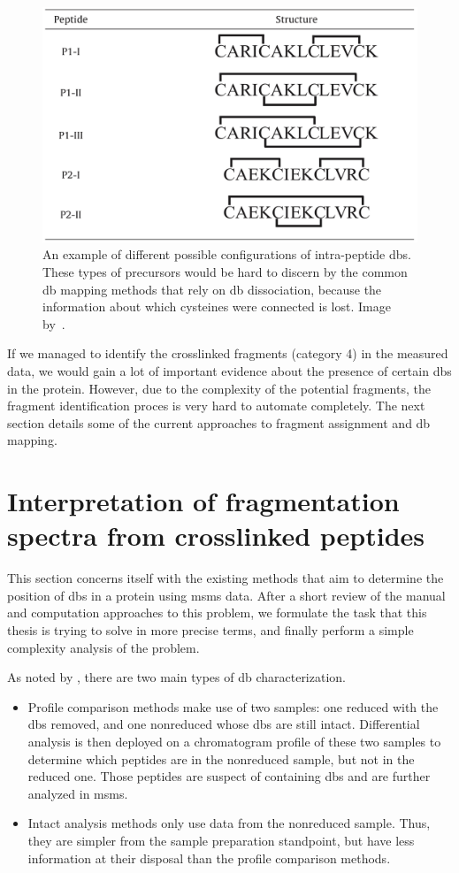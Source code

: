 \begin{figure}
  \centering
  \includegraphics[width=.5\linewidth]{img/intrapeptide-bond.jpeg}
  \caption{An example of different possible configurations of intra-peptide \glspl*{db}. These types of precursors would be hard to discern by the common \gls*{db} mapping methods that rely on \gls*{db} dissociation, because the information about which cysteines were connected is lost. Image by~\citet{durand2013tandem}.}\label{fig:intrapeptide-bonds}
\end{figure}

If we managed to identify the crosslinked fragments (category 4) in the measured data, we would gain a lot of important evidence about the presence of certain \glspl*{db} in the protein. However, due to the complexity of the potential fragments, the fragment identification proces is very hard to automate completely. The next section details some of the current approaches to fragment assignment and \gls*{db} mapping.

\section{Interpretation of fragmentation spectra from crosslinked peptides}\label{sec:analysis}

This section concerns itself with the existing methods that aim to determine the position of \glspl*{db} in a protein using \gls*{msms} data. After a short review of the manual and computation approaches to this problem, we formulate the task that this thesis is trying to solve in more precise terms, and finally perform a simple complexity analysis of the problem.

As noted by \citet{lakbub2018recent}, there are two main types of \gls*{db} characterization.

\begin{itemize}
  \item Profile comparison methods make use of two samples: one reduced with the \glspl*{db} removed, and one nonreduced whose \glspl*{db} are still intact. Differential analysis is then deployed on a chromatogram profile of these two samples to determine which peptides are in the nonreduced sample, but not in the reduced one. Those peptides are suspect of containing \glspl*{db} and are further analyzed in \gls*{msms}\@.
  \item Intact analysis methods only use data from the nonreduced sample. Thus, they are simpler from the sample preparation standpoint, but have less information at their disposal than the profile comparison methods.
\end{itemize}

